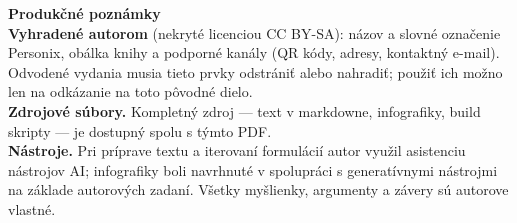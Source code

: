 \clearpage
\thispagestyle{empty}
\begin{flushleft}\small\sffamily
\textbf{Produkčné poznámky}\\[1.2em]

\textbf{Vyhradené autorom} (nekryté licenciou CC BY-SA): názov a slovné
označenie Personix, obálka knihy a podporné kanály (QR
kódy, adresy, kontaktný e-mail). Odvodené vydania musia tieto prvky odstrániť
alebo nahradiť; použiť ich možno len na odkázanie na toto pôvodné dielo.\\[1.2em]

\textbf{Zdrojové súbory.} Kompletný zdroj --- text v markdowne, infografiky,
build skripty --- je dostupný spolu s týmto PDF.\\[1.2em]

\textbf{Nástroje.} Pri príprave textu a iterovaní formulácií autor využil
asistenciu nástrojov AI; infografiky boli navrhnuté v spolupráci s
generatívnymi nástrojmi na základe autorových zadaní.
Všetky myšlienky, argumenty a závery sú autorove vlastné.
\end{flushleft}
\clearpage
